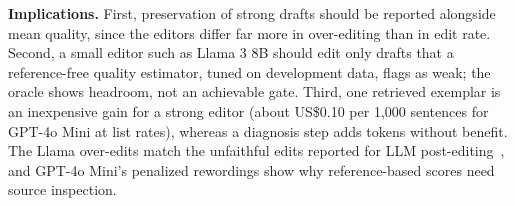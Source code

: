 \textbf{Implications.} First, preservation of strong drafts should be reported alongside mean quality, since the editors differ far more in over-editing than in edit rate. Second, a small editor such as Llama 3 8B should edit only drafts that a reference-free quality estimator, tuned on development data, flags as weak; the oracle shows headroom, not an achievable gate. Third, one retrieved exemplar is an inexpensive gain for a strong editor (about US\$0.10 per 1{,}000 sentences for GPT-4o Mini at list rates), whereas a diagnosis step adds tokens without benefit. The Llama over-edits match the unfaithful edits reported for LLM post-editing~\cite{raunak2023}, and GPT-4o Mini's penalized rewordings show why reference-based scores need source inspection.
